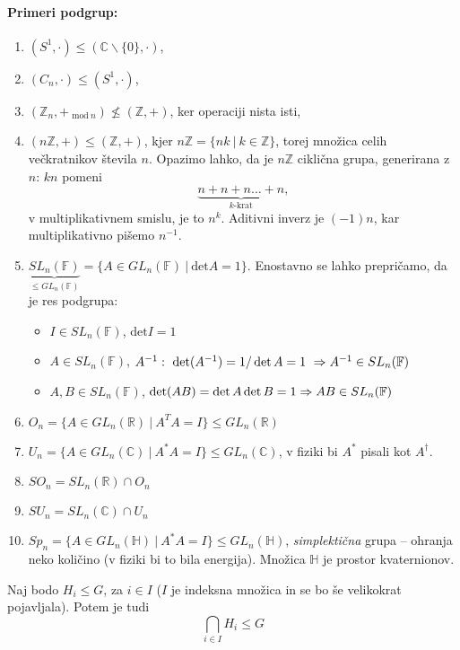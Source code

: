 \paragraph{Primeri podgrup:}
\begin{enumerate}
	\item{$(S^1,\cdot) \leq (\mathbb{C}\backslash\{0\}, \cdot)$},
	\item{$(C_n,\cdot) \leq (S^1, \cdot)$},
	\item{$(\mathbb{Z}_n, +\ {}_{\text{mod}\ n}) \nleq (\mathbb{Z}, +)$, ker operaciji nista isti,}
	\item{$(n\mathbb{Z}, +) \leq (\mathbb{Z}, +)$, kjer $n\mathbb{Z} = \{nk\ |\ k \in \mathbb{Z}\}$, torej mno\v zica celih ve\v ckratnikov
		\v stevila $n$. Opazimo lahko, da je $n\mathbb{Z}$ cikli\v cna grupa, generirana z $n$: $kn$ pomeni
		\[
			\underbrace{n + n + n \ldots + n}_{k\text{-krat}},
		\] v multiplikativnem smislu, je to $n^k$. Aditivni inverz je $(-1)n$, kar multiplikativno pi\v semo $n^{-1}$.}
	\item{$\underbrace{SL_n(\mathbb{F})}_{\leq GL_n(\mathbb{F})} = \{A \in GL_n(\mathbb{F})\ |\ \text{det}A = 1\}$. Enostavno se lahko prepri\v camo, da je
		res podgrupa:
		\begin{itemize}
			\item{$I \in SL_n(\mathbb{F})$, $\text{det}I = 1$}
			\item{$A \in SL_n(\mathbb{F})$, $A^{-1}:\ \det (A^{-1}) = 1/\det A = 1\ \Rightarrow A^{-1} \in SL_n(\mathbb{F})$}
			\item{$A,B \in SL_n(\mathbb{F})$, $\det (AB) = \det A\det B = 1 \Rightarrow AB \in SL_n(\mathbb{F})$}
		\end{itemize}}
	\item{$O_n = \{A \in GL_n(\mathbb{R})\ |\ A^T A = I\} \leq GL_n (\mathbb{R})$}
	\item{$U_n = \{A \in GL_n(\mathbb{C})\ |\ A^* A = I\} \leq GL_n (\mathbb{C})$, v fiziki bi $A^*$ pisali kot $A^\dagger$.}
	\item{$SO_n = SL_n (\mathbb{R}) \cap O_n$}
	\item{$SU_n = SL_n (\mathbb{C}) \cap U_n$}
	\item{$Sp_n = \{A \in GL_n(\mathbb{H})\ |\ A^* A = I\} \leq GL_n (\mathbb{H})$, \emph{simplekti\v cna} grupa -- ohranja neko koli\v cino (v fiziki bi to bila energija). Mno\v zica
		$\mathbb{H}$ je prostor kvaternionov.}
\end{enumerate}

\begin{trditev}
	Naj bodo $H_i \leq G$, za $i \in I$ ($I$ je indeksna mno\v zica in se bo \v se velikokrat pojavljala). Potem je tudi
	\[
		\bigcap_{i\in I} H_i \leq G
	\]
\end{trditev}


